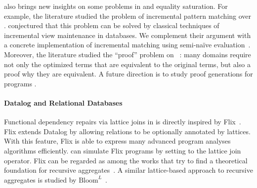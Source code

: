 \Egglog also brings new insights on some problems in \egraphs and equality saturation.
For example, 
 the literature studied the problem of incremental pattern matching over \egraphs.
\citet{relational-ematching} conjectured that this problem can be solved by 
 classical techniques of incremental view maintenance in databases.
We complement their argument with a concrete implementation of 
 incremental matching using semi-na\"ive evaluation~\citep{seminaive}.
Moreover, 
 the literature studied the ``proof'' problem on \egraphs~\citep{pp-congr,flatt2022small}:
 many domains require not only the optimized terms that are equivalent to the original terms,
 but also a proof why they are equivalent.
A future direction is to study proof generations for \egglog programs%
.


\paragraph{Datalog and Relational Databases}
Functional dependency repairs via lattice joins in \egglog is directly inspired by Flix~\citep{flix}.
Flix extends Datalog by allowing relations to be optionally annotated by lattices.
With this feature, 
 Flix is able to express many advanced program analyses algorithms efficiently.
\egglog can simulate Flix programs by setting \merge to the lattice join operator.   
Flix can be regarded as among the works that 
 try to find a theoretical foundation for recursive aggregates~\citep{agg-semantics,datalog-subsumption,mono-agg,datalogo}.
A similar lattice-based approach to recursive aggregates is studied by $\text{Bloom}^L$~\citep{bloom-lattice}.

